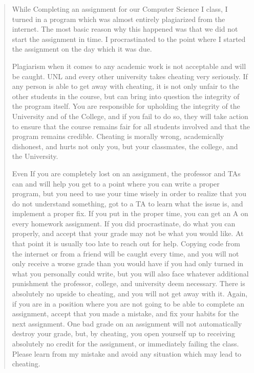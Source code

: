 \documentclass[12pt]{scrartcl}
\begin{document}
\begin{quote}
While Completing an assignment for our Computer Science I class, I turned
in a program which was almost entirely plagiarized from the internet.
The most basic reason why this happened was that we did not start the
assignment in time.  I procrastinated to the point where I started the
assignment on the day which it was due.

Plagiarism when it comes to any academic work is not acceptable and
will be caught.  UNL and every other university takes
cheating very seriously.  If any person is able to get away with
cheating, it is not only unfair to the other students in the course,
but can bring into question the integrity of the program itself.
You are responsible for upholding the integrity of the University
and of the College, and if you fail to do so, they will take action
to ensure that the course remains fair for all students involved and
that the program remains credible.  Cheating is morally wrong,
academically dishonest, and hurts not only you, but your classmates,
the college, and the University.

Even If you are completely lost on an assignment, the professor and TAs
can and will help you get to a point where you can write a proper
program, but you need to use your time wisely in order to realize
that you do not understand something, got to a TA to learn what
the issue is, and implement a proper fix.  If you put in the proper
time, you can get an A on every homework assignment.  If you did
procrastinate, do what you can properly, and accept that your grade
may not be what you would like.  At that point it is usually too late
to reach out for help.  Copying code from the internet or from a friend
will be caught every time, and you will not only receive a worse grade
than you would have if you had only turned in what you personally could
write, but you will also face whatever additional punishment the
professor, college, and university deem necessary.  There is absolutely
no upside to cheating, and you will not get away with it.  Again,
if you are in a position where you are not going to be able to complete
an assignment, accept that you made a mistake, and fix your habits for
the next assignment.  One bad grade on an assignment will not automatically
destroy your grade, but, by cheating, you open yourself up to receiving
absolutely no credit for the assignment, or immediately failing the
class. Please learn from my mistake and avoid any situation which may
lead to cheating.
\end{quote}
\end{document}
